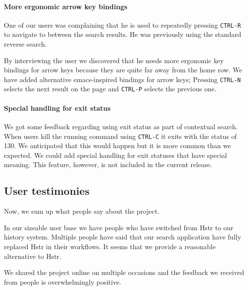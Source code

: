 \paragraph{More ergonomic arrow key bindings}

One of our users was complaining that he is used to repeatedly pressing \verb|CTRL-R| to navigate to between the search results. He was previously using the standard reverse search.

By interviewing the user we discovered that he needs more ergonomic key bindings for arrow keys because they are quite far away from the home row. We have added alternative emacs-inspired bindings for arrow keys; Pressing \verb|CTRL-N| selects the next result on the page and \verb|CTRL-P| selects the previous one.   


\paragraph{Special handling for exit status}

We got some feedback regarding using exit status as part of contextual search. When users kill the running command using \verb|CTRL-C| it exits with the status of 130.
We anticipated that this would happen but it is more common than we expected.
We could add special handling for exit statuses that have special meaning. This feature, however, is not included in the current release.



\subsection{User testimonies}

Now, we sum up what people say about the project. 

In our sizeable user base we have people who have switched from Hstr to our history system. Multiple people have said that our search application have fully replaced Hstr in their workflows. It seems that we provide a reasonable alternative to Hstr.

We shared the project online on multiple occasions and the feedback we received from people is overwhelmingly positive.\cite{resh-feedback}

